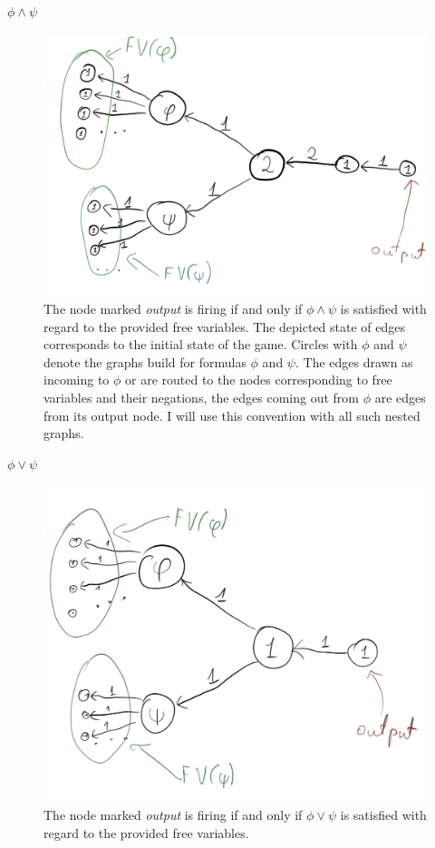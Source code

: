 \noindent
\underline{$\phi \land \psi$}
\begin{figure}[H]
      \centering
      \caption{
            The node marked \textit{output} is firing if and only if $\phi \land \psi$
            is satisfied with regard to the provided free variables.
            The depicted state of edges corresponds to the initial state of the game.
            Circles with $\phi$ and $\psi$ denote the graphs build for formulas $\phi$ and $\psi$.
            The edges drawn as incoming to $\phi$ or are routed to the nodes corresponding to
            free variables and their negations, the edges coming out from $\phi$ are edges from its
            output node. I will use this convention with all such nested graphs.
      }
      \includegraphics[scale=0.2]{content/graphics/game10.png}
\end{figure}

\noindent
\underline{$\phi \lor \psi$}
\begin{figure}[H]
      \centering
      \caption{
            The node marked \textit{output} is firing if and only if $\phi \lor \psi$
            is satisfied with regard to the provided free variables.
      }
      \includegraphics[scale=0.2]{content/graphics/game11.png}
\end{figure}


